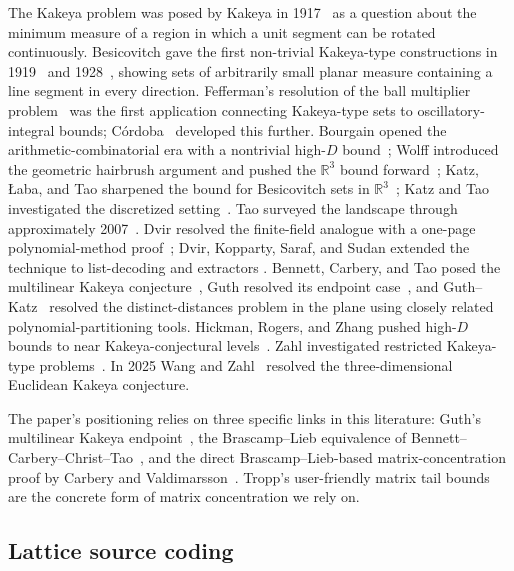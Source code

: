 \documentclass[11pt,a4paper]{article}
\theoremstyle{definition}
\theoremstyle{plain}
\newcommand{\R}{\mathbb{R}}
\begin{document}
The Kakeya problem was posed by Kakeya in 1917~\cite{kakeya-problem}
as a question about the minimum measure of a region in which a unit
segment can be rotated continuously. Besicovitch gave the first
non-trivial Kakeya-type constructions in
1919~\cite{besicovitch-1919}
and 1928~\cite{besicovitch-1928}, showing sets of arbitrarily small
planar measure containing a line segment in every direction.
Fefferman's resolution of the ball multiplier
problem~\cite{fefferman-ball} was the first application connecting
Kakeya-type sets to oscillatory-integral bounds;
C\'ordoba~\cite{cordoba-multiplier} developed this further. Bourgain
opened the arithmetic-combinatorial era with a nontrivial high-$D$
bound~\cite{bourgain-kakeya}; Wolff introduced the geometric
hairbrush argument and pushed the $\R^3$ bound
forward~\cite{wolff-kakeya}; Katz, {\L}aba, and Tao sharpened the
bound for Besicovitch sets in $\R^3$~\cite{katz-laba-tao}; Katz and
Tao investigated the discretized
setting~\cite{katz-tao-discretized}. Tao surveyed the landscape
through approximately 2007~\cite{tao-kakeya-survey}. Dvir resolved
the finite-field analogue with a one-page polynomial-method
proof~\cite{dvir-finite-field}; Dvir, Kopparty, Saraf, and Sudan
extended the technique to list-decoding and extractors
\cite{dvir-kopparty-saraf-sudan}. Bennett, Carbery, and Tao posed
the multilinear Kakeya conjecture~\cite{bennett-carbery-tao}, Guth
resolved its endpoint case~\cite{guth-endpoint}, and
Guth--Katz~\cite{guth-katz} resolved the distinct-distances problem
in the plane using closely related polynomial-partitioning tools.
Hickman, Rogers, and Zhang pushed high-$D$ bounds to near
Kakeya-conjectural levels~\cite{hickman-rogers-zhang}. Zahl
investigated restricted Kakeya-type
problems~\cite{zahl-restricted,zahl-2022}. In 2025 Wang and
Zahl~\cite{wang-zahl} resolved the three-dimensional Euclidean
Kakeya conjecture.

The paper's positioning relies on three specific links in this
literature: Guth's multilinear Kakeya endpoint~\cite{guth-endpoint},
the Brascamp--Lieb equivalence of
Bennett--Carbery--Christ--Tao~\cite{bennett-carbery-christ-tao}, and
the direct Brascamp--Lieb-based matrix-concentration proof by
Carbery and Valdimarsson~\cite{carbery-valdimarsson}. Tropp's
user-friendly matrix tail bounds~\cite{tropp-matrix-chernoff} are
the concrete form of matrix concentration we rely on.

\subsection{Lattice source coding}
\end{document}
